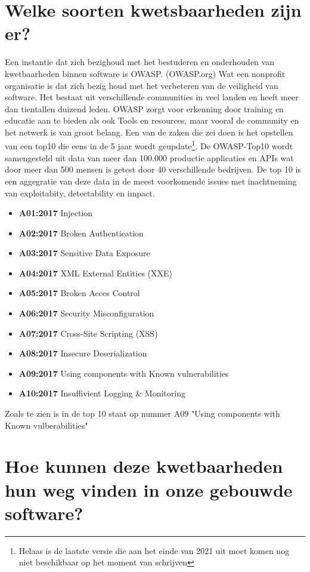 \section{Welke soorten kwetsbaarheden zijn er?}
Een instantie dat zich bezighoud met het bestuderen en onderhouden van kwetbaarheden binnen software is OWASP. (OWASP.org) Wat een nonprofit organisatie is dat zich bezig houd met het verbeteren van de veiligheid van software. Het bestaat uit verschillende communities in veel landen en heeft meer dan tientallen duizend leden. OWASP zorgt voor erkenning door training en educatie aan te bieden als ook Tools en resources, maar vooral de community en het netwerk is van groot belang. Een van de zaken die zei doen is het opstellen van een top10 die eens in de 5 jaar wordt geupdate\footnote{Helaas is de laatste versie die aan het einde van 2021 uit moet komen nog niet beschikbaar op het moment van schrijven}. De OWASP-Top10 wordt samengesteld uit data van meer dan 100.000 productie applicaties en APIs wat door meer dan 500 mensen is getest door 40 verschillende bedrijven. De top 10 is een aggegratie van deze data in de meest voorkomende issues met inachtneming van exploitabity, detectability en impact.
\begin{itemize}
\item \textbf{A01:2017} Injection
\item \textbf{A02:2017} Broken Authentication
\item \textbf{A03:2017} Sensitive Data Exposure
\item \textbf{A04:2017} XML External Entities (XXE)
\item \textbf{A05:2017} Broken Acces Control
\item \textbf{A06:2017} Security Misconfiguration
\item \textbf{A07:2017} Cross-Site Scripting (XSS)
\item \textbf{A08:2017} Insecure Deserialization
\item \textbf{A09:2017} Using components with Known vulnerabilities
\item \textbf{A10:2017} Insuffivient Logging \& Monitoring
\end{itemize}

Zoals te zien is in de top 10 staat op nummer A09 "Using components with Known vulberabilities"
\section{Hoe kunnen deze kwetbaarheden hun weg vinden in onze gebouwde software?}
